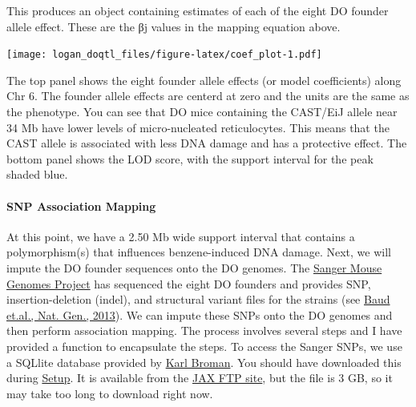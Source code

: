 \documentclass[]{article}
\newenvironment{Shaded}{\begin{snugshade}}{\end{snugshade}}
\newcommand{\KeywordTok}[1]{\textcolor[rgb]{0.13,0.29,0.53}{\textbf{#1}}}
\newcommand{\DataTypeTok}[1]{\textcolor[rgb]{0.13,0.29,0.53}{#1}}
\newcommand{\StringTok}[1]{\textcolor[rgb]{0.31,0.60,0.02}{#1}}
\newcommand{\OperatorTok}[1]{\textcolor[rgb]{0.81,0.36,0.00}{\textbf{#1}}}
\newcommand{\NormalTok}[1]{#1}
\let\oldparagraph\paragraph
\renewcommand{\paragraph}[1]{\oldparagraph{#1}\mbox{}}
\begin{document}
This produces an object containing estimates of each of the eight DO
founder allele effect. These are the βj values in the mapping equation
above.

\begin{Shaded}
\end{Shaded}

\texttt{[image: logan\_doqtl\_files/figure-latex/coef\_plot-1.pdf]}

The top panel shows the eight founder allele effects (or model
coefficients) along Chr 6. The founder allele effects are centerd at
zero and the units are the same as the phenotype. You can see that DO
mice containing the CAST/EiJ allele near 34 Mb have lower levels of
micro-nucleated reticulocytes. This means that the CAST allele is
associated with less DNA damage and has a protective effect. The bottom
panel shows the LOD score, with the support interval for the peak shaded
blue.

\paragraph{SNP Association Mapping}\label{snp-association-mapping}

At this point, we have a 2.50 Mb wide support interval that contains a
polymorphism(s) that influences benzene-induced DNA damage. Next, we
will impute the DO founder sequences onto the DO genomes. The
\href{http://www.sanger.ac.uk/resources/mouse/genomes/}{Sanger Mouse
Genomes Project} has sequenced the eight DO founders and provides SNP,
insertion-deletion (indel), and structural variant files for the strains
(see
\href{http://www.nature.com/ng/journal/v45/n7/full/ng.2644.html}{Baud
et.al., Nat. Gen., 2013}). We can impute these SNPs onto the DO genomes
and then perform association mapping. The process involves several steps
and I have provided a function to encapsulate the steps. To access the
Sanger SNPs, we use a SQLlite database provided by
\href{https://github.com/kbroman}{Karl Broman}. You should have
downloaded this during \href{../setup.md}{Setup}. It is available from
the \href{ftp://ftp.jax.org/dgatti/CC_SNP_DB/cc_variants.sqlite}{JAX FTP
site}, but the file is 3 GB, so it may take too long to download right
now.
\end{document}
